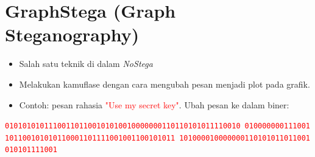 \documentclass{article}
\begin{document}

\section*{GraphStega (Graph Steganography)}

\begin{itemize}
    \item Salah satu teknik di dalam \textit{NoStega}
    \item Melakukan kamuflase dengan cara mengubah pesan menjadi plot pada grafik.
    \item Contoh: pesan rahasia \textcolor{red}{"Use my secret key"}.
    Ubah pesan ke dalam biner:
\end{itemize}

\begin{center}
    \textcolor{red}{\texttt{010101010111001101100101010010000000110110101011110010}}\
    \textcolor{red}{\texttt{010000000111001101100101010110001101111001001100101011}}\
    \textcolor{red}{\texttt{101000010000000110101011011001010101111001}}
\end{center}
\end{document}
